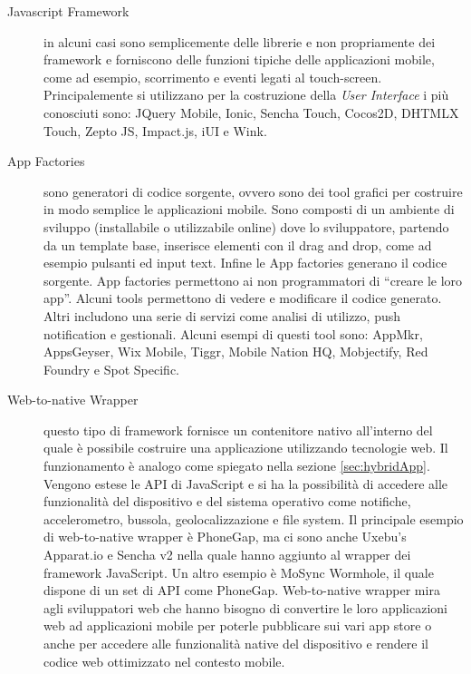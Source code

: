 \begin{description}

\item[Javascript Framework] in alcuni casi sono semplicemente delle librerie e non propriamente dei framework e forniscono delle funzioni tipiche delle applicazioni mobile, come ad esempio, scorrimento e eventi legati al touch-screen. Principalemente si utilizzano per la costruzione della \emph{User Interface} i più conosciuti sono: JQuery Mobile, Ionic, Sencha Touch, Cocos2D, DHTMLX Touch, Zepto JS, Impact.js, iUI e Wink.

\item[App Factories] sono generatori di codice sorgente, ovvero sono dei tool grafici per costruire in modo semplice le applicazioni mobile. Sono composti di un ambiente di sviluppo (installabile o utilizzabile online) dove lo sviluppatore, partendo da un template base, inserisce elementi con il drag and drop, come ad esempio pulsanti ed input text. Infine le App factories generano il codice sorgente. App factories permettono ai non programmatori di “creare le loro app”. Alcuni tools permettono di vedere e modificare il codice generato. Altri includono una serie di servizi come analisi di utilizzo, push notification e gestionali.
Alcuni esempi di questi tool sono: AppMkr, AppsGeyser, Wix Mobile, Tiggr, Mobile Nation HQ, Mobjectify, Red Foundry e Spot Specific.

\item[Web-to-native Wrapper] questo tipo di framework fornisce un contenitore nativo all'interno del quale è possibile costruire una applicazione utilizzando tecnologie web. Il funzionamento è analogo come spiegato nella sezione \ref{sec:hybridApp}. Vengono estese le API di JavaScript e si ha la possibilità di accedere alle funzionalità del dispositivo e del sistema operativo come notifiche, accelerometro, bussola, geolocalizzazione e file system.
Il principale esempio di web-to-native wrapper è PhoneGap, ma ci sono anche Uxebu’s Apparat.io e Sencha v2 nella quale hanno aggiunto al wrapper dei framework JavaScript. Un altro esempio è MoSync Wormhole, il quale
dispone di un set di API come PhoneGap. Web-to-native wrapper mira agli sviluppatori web che hanno bisogno di convertire le loro applicazioni web ad applicazioni mobile per poterle pubblicare sui vari app store o anche per accedere alle funzionalità native del dispositivo e rendere il codice web ottimizzato nel contesto mobile.


\end{description}
